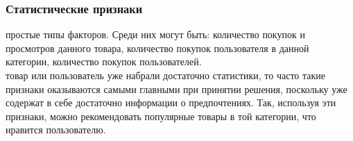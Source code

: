 \documentclass{article}
\newcommand\tab[1][1cm]{\hspace*{#1}}
\begin{document}
\subsubsection{Статистические признаки}
 простые типы факторов. Среди них могут быть: количество покупок и просмотров данного товара, количество покупок пользователя в данной категории, количество покупок пользователей.\\
 товар или пользователь уже набрали достаточно статистики, то часто такие признаки оказываются самыми главными при принятии решения, поскольку уже содержат в себе достаточно информации о предпочтениях. Так, используя эти признаки, можно рекомендовать популярные товары в той категории, что нравится пользователю.

\end{document}
